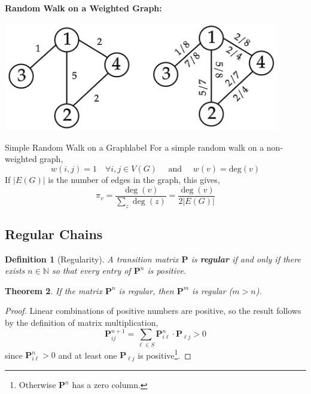 \documentclass{tufte-handout}
\newtheorem{thm}{Theorem}
\newtheorem{defn}[thm]{Definition}
\begin{document}
  \begin{marginfigure}
    \textbf{Random Walk on a Weighted Graph:}
    \begin{center}
      \includegraphics[width=0.9\textwidth]{fig-1.png}
    \end{center}
  \end{marginfigure}

  \begin{ex}{Simple Random Walk on a Graph}{label}
    For a simple random walk on a non-weighted graph, 
    \[w(i,j) = 1 \quad \forall i,j \in V(G) \quad \text{ and } \quad w(v) = \text{deg}(v)\]
    If $|E(G)|$ is the number of edges in the graph, this gives,
    \[\pi_{v}=\frac{\operatorname{deg}(v)}{\sum_{z} \operatorname{deg}(z)}=\frac{\operatorname{deg}(v)}{2 |E(G)|}\]
  \end{ex}

  \subsection{Regular Chains}
    \begin{defn}[Regularity]
    A transition matrix $\boldsymbol{P}$ is \textbf{regular} if and only if there exists $n \in \mathbb{N}$ so that every entry of $\boldsymbol{P}^n$ is positive.
  \end{defn}

  \begin{thm}
    If the matrix $\boldsymbol{P}^n$ is regular, then $\boldsymbol{P}^m$ is regular ($m > n$).
  \end{thm}

  \begin{proof}
    Linear combinations of positive numbers are positive, so the result follows by the definition of matrix multiplication,
    \[\boldsymbol{P}_{i j}^{n+1}=\sum_{\ell \in S} \boldsymbol{P}_{i \ell}^{n} \cdot \boldsymbol{P}_{\ell j}>0\]
    \noindent since $\boldsymbol{P}_{i \ell}^{n}>0$ and at least one $\boldsymbol{P}_{\ell j}$ is positive\footnote{Otherwise $\boldsymbol{P}^n$ has a zero column.}.
  \end{proof}
\end{document}
